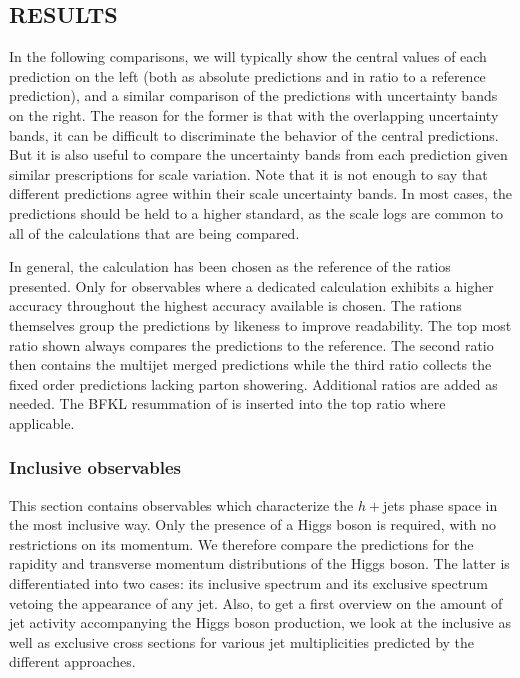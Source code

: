 \subsection{RESULTS}
\label{sec:hjetscomp:results}

In the following comparisons, we will typically show the central
values of each prediction on the left (both as absolute predictions
and in ratio to a reference prediction), and a similar comparison of
the predictions with uncertainty bands on the right. The reason for
the former is that with the overlapping uncertainty bands, it can be
difficult to discriminate the behavior of the central predictions. But
it is also useful to compare the uncertainty bands from each
prediction given similar prescriptions for scale variation.  Note that
it is not enough to say that different predictions agree within their
scale uncertainty bands. In most cases, the predictions should be held
to a higher standard, as the scale logs are common to all of the
calculations that are being compared.

In general, the \Powheg \NNLOPS calculation has been chosen as the 
reference of the ratios presented. Only for observables where a 
dedicated calculation exhibits a higher accuracy throughout the 
highest accuracy available is chosen. The rations themselves group 
the predictions by likeness to improve readability. The top most 
ratio shown always compares the \NNLOPS predictions to the reference. 
The second ratio then contains the multijet merged predictions while 
the third ratio collects the fixed order predictions lacking parton 
showering. Additional ratios are added as needed. The BFKL resummation 
of \Hej is inserted into the top ratio where applicable.



\subsubsection{Inclusive observables}
\label{sec:hjetscomp:results:inclobs}

This section contains observables which characterize the $h+{}$jets
phase space in the most inclusive way. Only the presence of a Higgs
boson is required, with no restrictions on its momentum. We therefore
compare the predictions for the rapidity and transverse momentum
distributions of the Higgs boson. The latter is differentiated into
two cases: its inclusive spectrum and its exclusive spectrum vetoing
the appearance of any jet. Also, to get a first overview on the amount
of jet activity accompanying the Higgs boson production, we look at
the inclusive as well as exclusive cross sections for various jet
multiplicities predicted by the different approaches.

